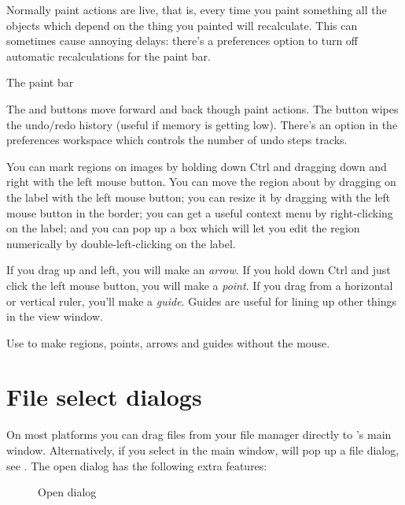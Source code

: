 Normally paint actions are live, that is, every time you paint something all
the objects which depend on the thing you painted will recalculate. This can
sometimes cause annoying delays: there's a preferences option to turn off
automatic recalculations for the paint bar.

\begin{fig2}
\caption{The paint bar}
\end{fig2}

The  and  buttons move forward and back though paint
actions. The  button wipes the undo/redo history (useful if memory
is getting low). There's an option in the preferences workspace which controls
the number of undo steps \nip{} tracks.

You can mark regions on images by holding down Ctrl and dragging down and
right with the left mouse button.  You can move the region about by dragging
on the label with the left mouse button; you can resize it by dragging with
the left mouse button in the border; you can get a useful context menu by
right-clicking on the label; and you can pop up a box which will let you
edit the region numerically by double-left-clicking on the label.  

If you drag up and left, you will make an \emph{arrow}.  If you hold down Ctrl
and just click the left mouse button, you will make a \emph{point}. If you
drag from a horizontal or vertical ruler, you'll make a \emph{guide}. Guides
are useful for lining up other things in the view window.

Use  to make regions, points, arrows and guides without
the mouse.

\section{File select dialogs}

On most platforms you can drag files from your file manager directly to
\nip{}'s main window.  Alternatively, if you select 
in the main window, \nip{} will pop up a file dialog, see
. The open dialog has the following extra features:

\begin{figure}
\caption{Open dialog}
\end{figure}

